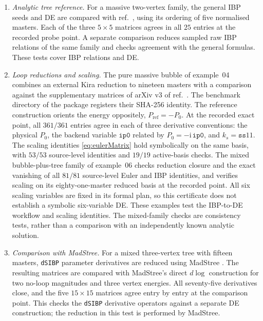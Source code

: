 \documentclass[11pt,a4paper]{article}
\begin{document}
\begin{enumerate}
\item \emph{Analytic tree reference.} For a massive two-vertex family, the general IBP seeds and
DE are compared with ref.~\cite{Chen:2024glu}, using its ordering of five normalised masters.
Each of the three $5\times5$ matrices agrees in all $25$ entries at the recorded probe point.
A separate comparison reduces sampled raw IBP relations of the same family and checks agreement
with the general formulas. These tests cover IBP relations and DE.
\item \emph{Loop reductions and scaling.} The pure massive bubble of example~04 combines an
external Kira reduction to nineteen masters with a comparison against the supplementary matrices
of arXiv v3 of ref.~\cite{Chen:2026dqp}. The benchmark directory of the package registers their
SHA-256 identity. The reference construction orients the energy oppositely,
$P_{\mathrm{ref}}=-P_0$. At the recorded exact point, all $361/361$ entries agree in each of three
derivative conventions: the physical $P_0$, the backend variable $\texttt{ip0}$ related by
$P_0=-\mathrm{i}\,\texttt{ip0}$, and $k_s=\texttt{ss}11$. The scaling identities
\eqref{eq:eulerMatrix} hold symbolically on the same basis, with $53/53$ source-level identities
and $19/19$ active-basis checks. The mixed bubble-plus-tree family of example~06 checks reduction
closure and the exact vanishing of all $81/81$ source-level Euler and IBP identities, and verifies
scaling on its eighty-one-master reduced basis at the recorded point. All six scaling variables
are fixed in its formal plan, so this certificate does not establish a symbolic six-variable DE.
These examples test the IBP-to-DE workflow and scaling identities. The mixed-family checks are
consistency tests, rather than a comparison with an independently known analytic solution.
\item \emph{Comparison with MadStree.} For a mixed three-vertex tree with fifteen masters,
\texttt{dSIBP} parameter derivatives are reduced using MadStree
\cite{MadStree:inpreparation}. The resulting matrices are compared with MadStree's direct
$d\log$ construction for two no-loop magnitudes and three vertex energies. All seventy-five
derivatives close, and the five $15\times15$ matrices agree entry by entry at the comparison
point. This checks the
\texttt{dSIBP} derivative operators against a separate DE construction; the reduction in this
test is performed by MadStree.
\end{enumerate}
\end{document}
